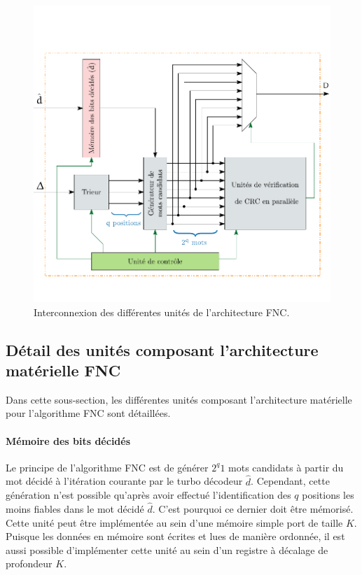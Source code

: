 \begin{figure}[!t]
	\centering
	\includegraphics{main/ch4_fig/ipe/fnc_arch.pdf}
	\caption{Interconnexion des différentes unités de l'architecture FNC. \label{fig:fnc_arch}}
\end{figure}

\subsection{Détail des unités composant l'architecture matérielle FNC}
Dans cette sous-section, les différentes unités composant l'architecture matérielle pour l'algorithme FNC sont détaillées.

\paragraph*{Mémoire des bits décidés} Le principe de l'algorithme FNC est de générer $2^q1$ mots candidats à partir 
du mot décidé à l'itération courante par le turbo décodeur $\hat{d}$. Cependant, cette génération n'est possible 
qu'après avoir effectué l'identification des $q$ positions les moins fiables dans le mot décidé $\hat{d}$. C'est pourquoi ce dernier doit 
être mémorisé. Cette unité peut être implémentée au sein d'une mémoire simple port de taille $K$. Puisque les données en 
mémoire sont écrites et lues de manière ordonnée, il est aussi possible d'implémenter cette unité au sein d'un registre à décalage 
de profondeur $K$.

